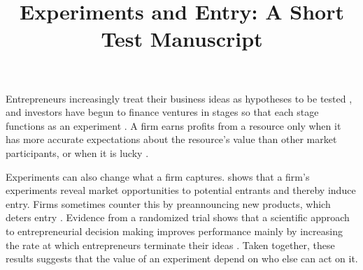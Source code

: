 \documentclass{article}
\title{Experiments and Entry: A Short Test Manuscript}
\begin{document}
\maketitle

Entrepreneurs increasingly treat their business ideas as hypotheses to be tested \citep{kerr2014}, and investors have begun to finance ventures in stages so that each stage functions as an experiment \citep{nanda2015}. A firm earns profits from a resource only when it has more accurate expectations about the resource's value than other market participants, or when it is lucky \citep{barney1986}.

Experiments can also change what a firm captures. \citet{schmalensee1981} shows that a firm's experiments reveal market opportunities to potential entrants and thereby induce entry. Firms sometimes counter this by preannouncing new products, which deters entry \citep{lieberman1988}. Evidence from a randomized trial shows that a scientific approach to entrepreneurial decision making improves performance mainly by increasing the rate at which entrepreneurs terminate their ideas \citep{camuffo2020}. Taken together, these results suggests that the value of an experiment depend on who else can act on it.



\end{document}
